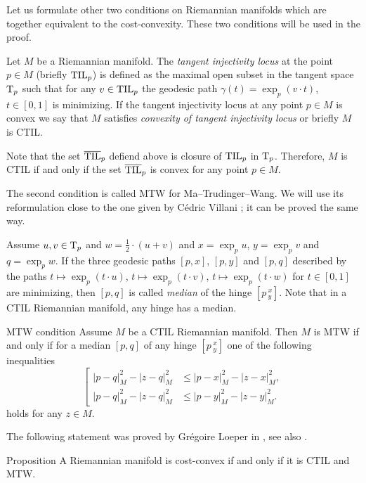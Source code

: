 Let us formulate other two conditions on Riemannian manifolds which are together equivalent to the cost-convexity.
These two conditions will be used in the proof.

Let $M$ be a Riemannian manifold.
The \emph{tangent injectivity locus} at the point $p\in M$ (briefly $\mathrm{\rm TIL}_p$) is defined as the maximal open subset in the tangent space $\mathrm{T}_p$ such that for any $v\in\mathrm{\rm TIL}_p$ the geodesic path $\gamma(t)=\exp_p(v\cdot t)$, $t\in [0,1]$ is minimizing.
If the tangent injectivity locus at any point $p\in M$ is convex we say that $M$ satisfies \emph{convexity of  tangent injectivity locus} or briefly $M$ is CTIL.

Note that the set $\overline{\mathrm{\rm TIL}}_p$ defiend above is closure of $\mathrm{\rm TIL}_p$ in $\mathrm{T}_p$.
Therefore, $M$ is CTIL if and only if the set $\overline{\mathrm{\rm TIL}}_p$ is convex for any point $p\in M$.

The second condition is called MTW for Ma--Trudinger--Wang.
We will use its reformulation close to the one given by Cédric Villani \cite[2.6]{MTW+CTIL}; it can be proved the same way.

Assume $u,v\in \mathrm{T}_p$ and $w=\tfrac12\cdot(u+v)$
and $x=\exp_p u$, $y=\exp_pv$ and $q=\exp_pw$.
If the three geodesic paths $[p,x]$, $[p,y]$ and $[p,q]$ described by the paths 
$t\mapsto\exp_p(t\cdot u)$,  $t\mapsto\exp_p(t\cdot v)$, $t\mapsto\exp_p(t\cdot w)$ for $t\in[0,1]$ are minimizing, then $[p,q]$ is called \emph{median} of the hinge $[p\,^x_y]$.
Note that in a CTIL Riemannian manifold, any hinge has a median.

\begin{thm}{MTW condition}\label{MTW}
Assume $M$ be a CTIL Riemannian manifold. 
Then $M$ is MTW if and only if for a median $[p,q]$ of any hinge $[p\,^x_y]$ one of the following inequalities
\[
\left[
\begin{aligned}
|p-q|^2_M-|z-q|^2_M&\le |p-x|^2_M-|z-x|^2_M,
\\
|p-q|^2_M-|z-q|^2_M&\le |p-y|^2_M-|z-y|^2_M.
\end{aligned}
\right.
\]
holds for any $z\in M$.
\end{thm}

The following statement was proved by Gr\'egoire Loeper in \cite{loeper}, see also \cite[Proposition 2.5]{MTW+CTIL}.

\begin{thm}{Proposition}\label{prop:cost-convex=CTIL+MTW}
A Riemannian manifold is cost-convex if and only if it is CTIL and MTW. 
\end{thm}

